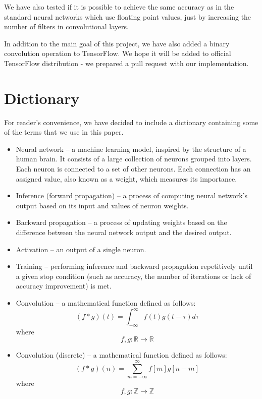 \documentclass[licencjacka]{pracamgr}
\begin{document}
	We have also tested if it is possible to achieve the same accuracy as in the standard neural networks which use floating point values, just by increasing the number of filters in convolutional layers.
	
	In addition to the main goal of this project, we have also added a binary convolution operation to TensorFlow. We hope it will be added to official TensorFlow distribution - we prepared a pull request with our implementation.

\chapter{Dictionary}
    For reader's convenience, we have decided to include a dictionary containing some of the terms that we use in this paper. 
    
    \begin{itemize}
        \item Neural network -- a machine learning model, inspired by the structure of a human brain. It consists of a large collection of neurons grouped into layers. Each neuron is connected to a set of other neurons. Each connection has an assigned value, also known as a weight, which measures its importance.
        
        \item Inference (forward propagation) -- a process of computing neural network's output based on its input and values of neuron weights.
        
        \item Backward propagation -- a process of updating weights based on the difference between the neural network output and the desired output.
        
         \item Activation -- an output of a single neuron.
        
        \item Training -- performing inference and backward propagation repetitively until a given stop condition (such as accuracy, the number of iterations or lack of accuracy improvement) is met.
               
        \item Convolution -- a mathematical function defined as follows: 
        $$ (f* g)(t) = \int_{-\infty}^{\infty} f(t)g(t-\tau)d\tau$$ where $$f,g\colon \mathbb{R}\rightarrow \mathbb{R}$$
        
        \item Convolution (discrete) -- a mathematical function defined as follows: 
        $$ (f* g)(n) = \sum_{m=-\infty}^{\infty} f[m] g[n-m]$$ where $$f,g\colon \mathbb{Z}\rightarrow \mathbb{Z}$$


\end{itemize}
\end{document}
